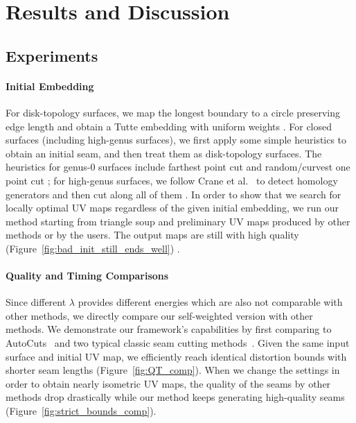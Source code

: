 
\section{Results and Discussion}
\label{sec:results}

\subsection{Experiments}
\label{sec:results_exp}

\paragraph{Initial Embedding} For disk-topology surfaces, we map the longest boundary to a circle preserving edge length and obtain a Tutte embedding with uniform weights . For closed surfaces (including high-genus surfaces), we first apply some simple heuristics to obtain an initial seam, and then treat them as disk-topology surfaces. 
The heuristics for genus-0 surfaces include farthest point cut and random/curvest one point cut ; for high-genus surfaces, we follow Crane et al.~ to detect homology generators and then cut along all of them \minchen{[TODO]}.
In order to show that we search for locally optimal UV maps regardless of the given initial embedding, we run our method starting from triangle soup and preliminary UV maps produced by other methods or by the users. The output maps are still with high quality (Figure~\ref{fig:bad_init_still_ends_well}) \minchen{[TODO]}.

\paragraph{Quality and Timing Comparisons}  Since different $\lambda$ provides different energies which are also not comparable with other methods, we directly compare our self-weighted version with other methods. We demonstrate our framework's capabilities by first comparing to AutoCuts~\cite{Poranne2017Autocuts} and two typical classic seam cutting methods~\cite{Gu2002Geometry,Sheffer2002Seamster}. Given the same input surface and initial UV map, we efficiently reach identical distortion bounds with shorter seam lengths (Figure~\ref{fig:QT_comp}). 
When we change the settings in order to obtain nearly isometric UV maps, the quality of the seams by other methods drop drastically while our method keeps generating high-quality seams (Figure~\ref{fig:strict_bounds_comp}).

